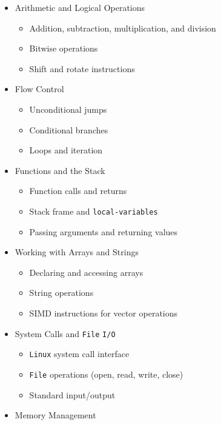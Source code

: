 \documentclass[
]{article}
\providecommand{\tightlist}{%
  \setlength{\itemsep}{0pt}\setlength{\parskip}{0pt}}
\begin{document}
\begin{itemize}
  \begin{itemize}
  \tightlist
  \item
    Integer representations
  \item
    Floating-point numbers
  \item
    MOV and other data transfer instructions
  \end{itemize}
\item
  Arithmetic and Logical Operations

  \begin{itemize}
  \tightlist
  \item
    Addition, subtraction, multiplication, and division
  \item
    Bitwise operations
  \item
    Shift and rotate instructions
  \end{itemize}
\item
  Flow Control

  \begin{itemize}
  \tightlist
  \item
    Unconditional jumps
  \item
    Conditional branches
  \item
    Loops and iteration
  \end{itemize}
\item
  Functions and the Stack

  \begin{itemize}
  \tightlist
  \item
    Function calls and returns
  \item
    Stack frame and \texttt{local-variables}
  \item
    Passing arguments and returning values
  \end{itemize}
\item
  Working with Arrays and Strings

  \begin{itemize}
  \tightlist
  \item
    Declaring and accessing arrays
  \item
    String operations
  \item
    SIMD instructions for vector operations
  \end{itemize}
\item
  System Calls and \texttt{File} \texttt{I/O}

  \begin{itemize}
  \tightlist
  \item
    \texttt{Linux} system call interface
  \item
    \texttt{File} operations (open, read, write, close)
  \item
    Standard input/output
  \end{itemize}
\item
  Memory Management


\end{itemize}
\end{document}
